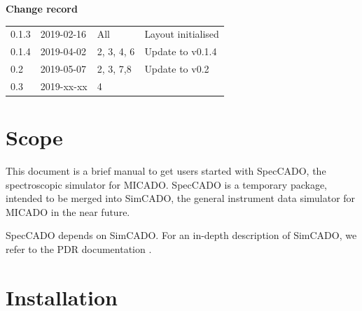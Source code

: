 \documentclass[a4paper,twoside,11pt]{article}
\begin{document}
\lstset{basicstyle=\ttfamily}
\dmdmaketitle


\begin{center}
  \textbf{Change record}

  \tabletail{\hline}

  \begin{supertabular}{|l|l|l|l|}
   0.1.3 & 2019-02-16 & All & Layout initialised \\
   0.1.4 & 2019-04-02 & 2, 3, 4, 6 & Update to v0.1.4 \\
   0.2   & 2019-05-07 & 2, 3, 7,8  & Update to v0.2 \\
   0.3   & 2019-xx-xx & 4          & \\
   \hline
  \end{supertabular}

\end{center}


\setcounter{tocdepth}{2}
\tableofcontents
\cleardoublepage


\section{Scope}
\label{sec:scope}

This document is a brief manual to get users started with SpecCADO,
the spectroscopic simulator for MICADO. SpecCADO is a temporary
package, intended to be merged into SimCADO, the general instrument
data simulator for MICADO in the near future.

SpecCADO depends on SimCADO. For an in-depth description of SimCADO,
we refer to the PDR documentation \cite{SimCADO-PDR}.

\section{Installation}
\label{sec:installation}
\end{document}
